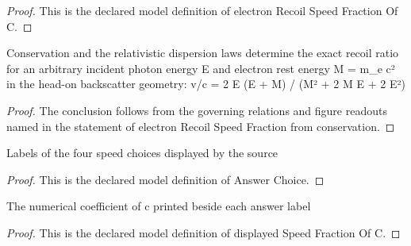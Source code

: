 \begin{proof}
  This is the declared model definition of electron Recoil Speed Fraction Of C.
\end{proof}
\begin{lemma}
  \label{lem:physics:phyx-mini-0569:phyxminiproblems-problemphyxmini0569-electronrecoilspeedfraction-from-conservation}
  Conservation and the relativistic dispersion laws determine the exact recoil ratio for an arbitrary incident photon energy E and electron rest energy M = m\_e c² in the head-on backscatter geometry: v/c = 2 E (E + M) / (M² + 2 M E + 2 E²)
\end{lemma}
\begin{proof}
  The conclusion follows from the governing relations and figure readouts named in the statement of electron Recoil Speed Fraction from conservation.
\end{proof}
\begin{definition}
  \label{def:physics:phyx-mini-0569:phyxminiproblems-problemphyxmini0569-answerchoice}
  Labels of the four speed choices displayed by the source
\end{definition}
\begin{proof}
  This is the declared model definition of Answer Choice.
\end{proof}
\begin{definition}
  \label{def:physics:phyx-mini-0569:phyxminiproblems-problemphyxmini0569-displayedspeedfractionofc}
  The numerical coefficient of c printed beside each answer label
\end{definition}
\begin{proof}
  This is the declared model definition of displayed Speed Fraction Of C.
\end{proof}
